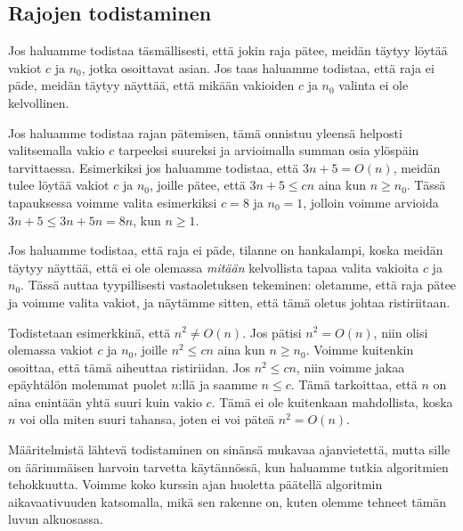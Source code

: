 \subsection{Rajojen todistaminen}

Jos haluamme todistaa täsmällisesti, että jokin raja pätee,
meidän täytyy löytää vakiot $c$ ja $n_0$, jotka osoittavat asian.
Jos taas haluamme todistaa, että raja ei päde,
meidän täytyy näyttää, että mikään vakioiden $c$ ja $n_0$ valinta ei ole kelvollinen.

Jos haluamme todistaa rajan pätemisen,
tämä onnistuu yleensä helposti valitsemalla vakio $c$
tarpeeksi suureksi ja arvioimalla summan osia ylöspäin tarvittaessa.
Esimerkiksi jos haluamme todistaa, että $3n+5 = O(n)$, meidän tulee löytää
vakiot $c$ ja $n_0$, joille pätee, että $3n+5 \le cn$ aina kun $n \ge n_0$.
Tässä tapauksessa voimme valita esimerkiksi $c=8$ ja $n_0=1$,
jolloin voimme arvioida $3n+5 \le 3n+5n=8n$, kun $n \ge 1$.

Jos haluamme todistaa, että raja ei päde, tilanne on hankalampi,
koska meidän täytyy näyttää, että ei ole olemassa \emph{mitään} kelvollista
tapaa valita vakioita $c$ ja $n_0$.
Tässä auttaa tyypillisesti vastaoletuksen tekeminen: oletamme,
että raja pätee ja voimme valita vakiot,
ja näytämme sitten, että tämä oletus johtaa ristiriitaan.

Todistetaan esimerkkinä, että $n^2 \neq O(n)$.
Jos pätisi $n^2=O(n)$, niin olisi olemassa vakiot $c$ ja $n_0$,
joille $n^2 \le cn$ aina kun $n \ge n_0$.
Voimme kuitenkin osoittaa, että tämä aiheuttaa ristiriidan.
Jos $n^2 \le cn$, niin voimme jakaa epäyhtälön molemmat puolet $n$:llä
ja saamme $n \le c$.
Tämä tarkoittaa, että $n$ on aina enintään yhtä suuri kuin vakio $c$.
Tämä ei ole kuitenkaan mahdollista, koska $n$ voi olla miten
suuri tahansa, joten ei voi päteä $n^2 = O(n)$.

Määritelmistä lähtevä todistaminen on sinänsä mukavaa ajanvietettä,
mutta sille on äärimmäisen harvoin tarvetta käytännössä,
kun haluamme tutkia algoritmien tehokkuutta.
Voimme koko kurssin ajan huoletta päätellä algoritmin aikavaativuuden
katsomalla, mikä sen rakenne on, kuten olemme tehneet tämän luvun alkuosassa.
